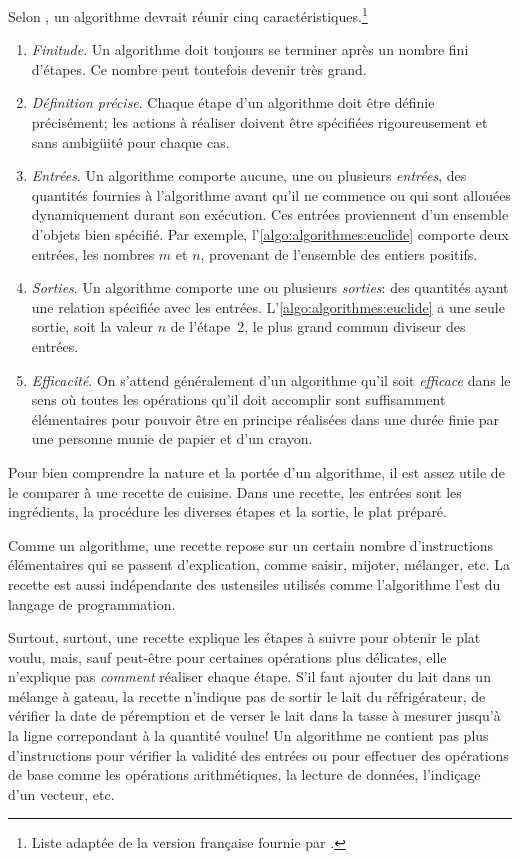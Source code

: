 Selon \citet[section~1.1]{Knuth:ACP:vol1:1997}, un algorithme devrait
réunir cinq caractéristiques.\footnote{%
  Liste adaptée de la version française fournie par
  \citet{Wikipedia:Algorithme}.}
\begin{enumerate}
\item \emph{Finitude}. Un algorithme doit toujours se terminer après
  un nombre fini d’étapes. Ce nombre peut toutefois devenir très
  grand.
\item \emph{Définition précise}. Chaque étape d'un algorithme doit
  être définie précisément; les actions à réaliser doivent être
  spécifiées rigoureusement et sans ambigüité pour chaque cas.
\item \emph{Entrées}. Un algorithme comporte aucune, une ou plusieurs
  \emph{entrées}, des quantités fournies à l'algorithme avant qu'il ne
  commence ou qui sont allouées dynamiquement durant son exécution.
  Ces entrées proviennent d'un ensemble d'objets bien spécifié. Par
  exemple, l'\autoref{algo:algorithmes:euclide} comporte deux entrées,
  les nombres $m$ et $n$, provenant de l'ensemble des entiers
  positifs.
\item \emph{Sorties}. Un algorithme comporte une ou plusieurs
  \emph{sorties}: des quantités ayant une relation spécifiée avec les
  entrées. L'\autoref{algo:algorithmes:euclide} a une seule sortie,
  soit la valeur $n$ de l'étape~2, le plus grand commun diviseur des
  entrées.
\item \emph{Efficacité}. On s'attend généralement d'un algorithme
  qu'il soit \emph{efficace} dans le sens où toutes les opérations
  qu'il doit accomplir sont suffisamment élémentaires pour pouvoir
  être en principe réalisées dans une durée finie par une personne
  munie de papier et d'un crayon.
\end{enumerate}

Pour bien comprendre la nature et la portée d'un algorithme, il est
assez utile de le comparer à une recette de cuisine. Dans une recette,
les entrées sont les ingrédients, la procédure les diverses étapes et
la sortie, le plat préparé.

Comme un algorithme, une recette repose sur un certain nombre
d'instructions élémentaires qui se passent d'explication, comme
saisir, mijoter, mélanger, etc. La recette est aussi indépendante des
ustensiles utilisés comme l'algorithme l'est du langage de
programmation.

Surtout, surtout, une recette explique les étapes à suivre pour
obtenir le plat voulu, mais, sauf peut-être pour certaines opérations
plus délicates, elle n'explique pas \emph{comment} réaliser chaque
étape. S'il faut ajouter du lait dans un mélange à gateau, la recette
n'indique pas de sortir le lait du réfrigérateur, de vérifier la date
de péremption et de verser le lait dans la tasse à mesurer jusqu'à la
ligne correpondant à la quantité voulue! Un algorithme ne contient pas
plus d'instructions pour vérifier la validité des entrées ou pour
effectuer des opérations de base comme les opérations arithmétiques,
la lecture de données, l'indiçage d'un vecteur, etc.

